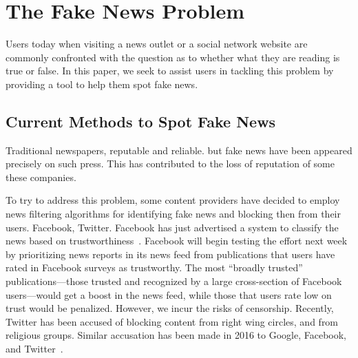 
\section{The Fake News Problem}

Users today when visiting a news outlet or a social network website are commonly confronted with the question as to whether what they are reading is true or false. In this paper, we seek to assist users in tackling this problem by providing a tool to help them spot fake news.
\subsection{Current Methods to Spot Fake News}

Traditional newspapers, reputable and reliable. but fake news have been appeared precisely on such press. This has contributed to the loss of reputation of some these companies.

 To try to address this problem, some content providers have decided to employ news filtering algorithms for identifying fake news and blocking then from their users. Facebook, Twitter. Facebook has just advertised a system to classify the news based on trustworthiness~\cite{fbrank}. Facebook will begin testing the effort next week by prioritizing news reports in its news feed from publications that users have rated in Facebook surveys as trustworthy. The most ``broadly trusted'' publications—those trusted and recognized by a large cross-section of Facebook users—would get a boost in the news feed, while those that users rate low on trust would be penalized. However, we incur the risks of censorship. Recently, Twitter has been accused of blocking content from right wing circles, and from religious groups. Similar accusation has been made in 2016 to Google, Facebook, and Twitter~\cite{accusedskew}.

